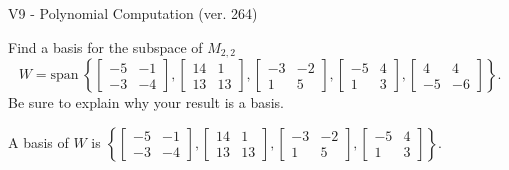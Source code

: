 \begin{exercise}
  \begin{exerciseTitle}V9 - Polynomial Computation (ver. 264)\end{exerciseTitle}
  \begin{exerciseStatement}
    Find a basis for the subspace of \(M_{2,2}\) 
\[W=\mathrm{span}\ \left\{\left[\begin{array}{cc}
-5 & -1 \\
-3 & -4
\end{array}\right] , \left[\begin{array}{cc}
14 & 1 \\
13 & 13
\end{array}\right] , \left[\begin{array}{cc}
-3 & -2 \\
1 & 5
\end{array}\right] , \left[\begin{array}{cc}
-5 & 4 \\
1 & 3
\end{array}\right] , \left[\begin{array}{cc}
4 & 4 \\
-5 & -6
\end{array}\right]\right\}.\]
 Be sure to explain why your result is a basis.


  \end{exerciseStatement}
  \begin{exerciseAnswer}
   A basis of \(W\) is  \(\left\{\left[\begin{array}{cc}
-5 & -1 \\
-3 & -4
\end{array}\right] , \left[\begin{array}{cc}
14 & 1 \\
13 & 13
\end{array}\right] , \left[\begin{array}{cc}
-3 & -2 \\
1 & 5
\end{array}\right] , \left[\begin{array}{cc}
-5 & 4 \\
1 & 3
\end{array}\right]\right\}\).
  


  \end{exerciseAnswer}
\end{exercise}